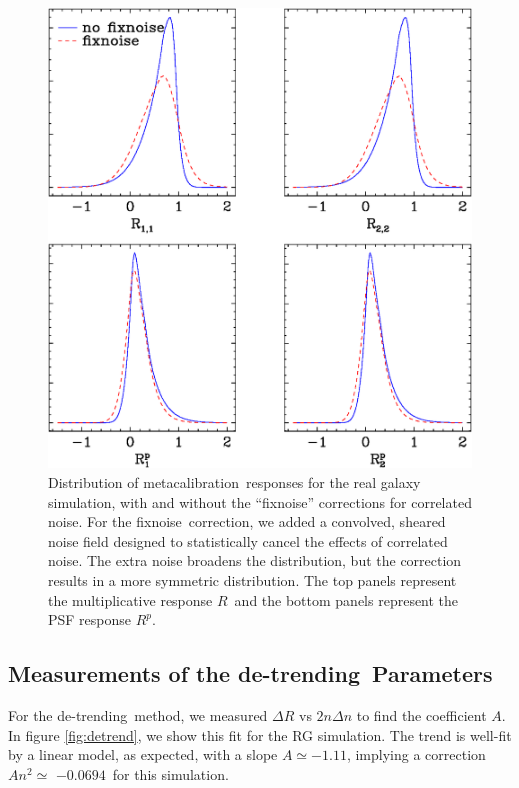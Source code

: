 \documentclass[usegraphicx,usenatbib]{mn2e}
\newcommand{\mcal}{metacalibration}
\newcommand{\mcalR}{$R$}
\newcommand{\mcalRpsf}{$R^{p}$}
\newcommand{\detrend}{de-trending}
\newcommand{\fixnoise}{fixnoise}
\newcommand{\Aslope}{$-1.11$}
\newcommand{\Rcorr}{$-0.0694$}
\begin{document}
\begin{figure}
    \centering
    \includegraphics[scale=0.45]{mcal-v14s01-v14s02-compare-R.eps}

    \caption{Distribution of \mcal\ responses for the real galaxy
    simulation, with and without the ``\fixnoise'' corrections
    for correlated noise.  For the \fixnoise\ correction, we
    added a convolved, sheared noise field designed to statistically
    cancel the effects of correlated noise.  The extra noise
    broadens the distribution, but the correction results in a more symmetric
    distribution.  The top panels represent the multiplicative
    response \mcalR\ and the bottom panels represent the PSF response \mcalRpsf.} 

\label{fig:Rdist}
\end{figure}


\subsection{Measurements of the \detrend\ Parameters}

For the \detrend\ method, we measured $\Delta R$ vs $2 n \Delta n$ to find the
coefficient $A$.  In figure \ref{fig:detrend}, we show this fit for the RG
simulation.  The trend is well-fit by a linear model, as expected, with a slope
$A \simeq $\Aslope, implying a correction $A n^2 \simeq$ \Rcorr\ for this
simulation.
\end{document}
